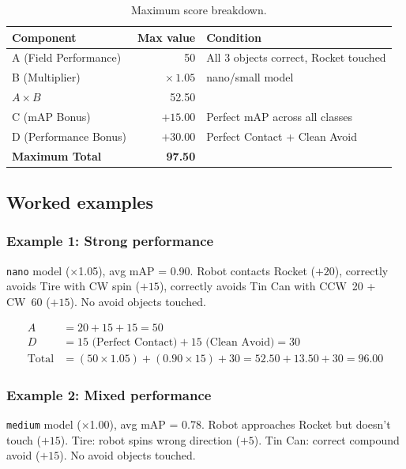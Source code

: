 \documentclass[a4]{article}
\begin{document}
\begin{table}[H]
\centering
\begin{tabular}{lrl}
\toprule
\textbf{Component} & \textbf{Max value} & \textbf{Condition} \\
\midrule
A (Field Performance) & 50 & All 3 objects correct, Rocket touched \\
B (Multiplier) & $\times\,1.05$ & nano/small model \\
$A \times B$ & 52.50 & \\
C (mAP Bonus) & $+15.00$ & Perfect mAP across all classes \\
D (Performance Bonus) & $+30.00$ & Perfect Contact + Clean Avoid \\
\midrule
\textbf{Maximum Total} & \textbf{97.50} & \\
\bottomrule
\end{tabular}
\caption{Maximum score breakdown.}
\end{table}

\subsection*{Worked examples}

\subsubsection*{Example 1: Strong performance}

\texttt{nano} model ($\times$1.05), avg mAP = 0.90. Robot contacts Rocket ($+20$), correctly avoids Tire with CW spin ($+15$), correctly avoids Tin Can with CCW~20\textdegree{} + CW~60\textdegree{} ($+15$). No avoid objects touched.

\begin{align*}
A &= 20 + 15 + 15 = 50 \\
D &= 15 \text{ (Perfect Contact)} + 15 \text{ (Clean Avoid)} = 30 \\
\text{Total} &= (50 \times 1.05) + (0.90 \times 15) + 30 = 52.50 + 13.50 + 30 = \mathbf{96.00}
\end{align*}

\subsubsection*{Example 2: Mixed performance}

\texttt{medium} model ($\times$1.00), avg mAP = 0.78. Robot approaches Rocket but doesn't touch ($+15$). Tire: robot spins wrong direction ($+5$). Tin Can: correct compound avoid ($+15$). No avoid objects touched.
\end{document}
